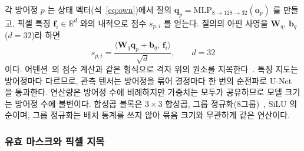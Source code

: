 각 방어정 $p$ 는 상태 벡터(식~\eqref{eq:own})에서 질의
$\mathbf{q}_p = \mathrm{MLP}_{8 \to 128 \to 32}(\mathbf{o}_p)$ 를 만들고, 픽셀 특징
$\mathbf{f}_i \in \mathbb{R}^{d}$ 와의 내적으로 점수 $s_{p,i}$ 를 얻는다. 질의의 아핀 사영을
$\mathbf{W}_q$, $\mathbf{b}_q$ ($d = 32$)라 하면
\begin{equation}
s_{p,i} = \frac{\langle \mathbf{W}_q \mathbf{q}_p + \mathbf{b}_q,\, \mathbf{f}_i \rangle}{\sqrt{d}}, \qquad d = 32
\label{eq:score}
\end{equation}
이다. 어텐션~\citep{vaswani2017attention}의 점수 계산과 같은 형식으로 격자 위의 원소를
지목한다~\citep{vinyals2015pointer}. 특징 지도는 방어정마다 다르므로, 관측 텐서는 방어정을 묶어 결정마다 한 번의 순전파로
U-Net 을 통과한다. 연산량은 방어정 수에 비례하지만 가중치는 모두가 공유하므로 모델 크기는
방어정 수에 불변이다. 합성곱 블록은 $3\times3$ 합성곱, 그룹 정규화(8그룹)~\citep{wu2018groupnorm},
SiLU 의 순이며, 그룹 정규화는 배치 통계를 쓰지 않아 묶음 크기와 무관하게 같은 연산이다.

\subsubsection{유효 마스크와 픽셀 지목}
\label{sec:validmask}

